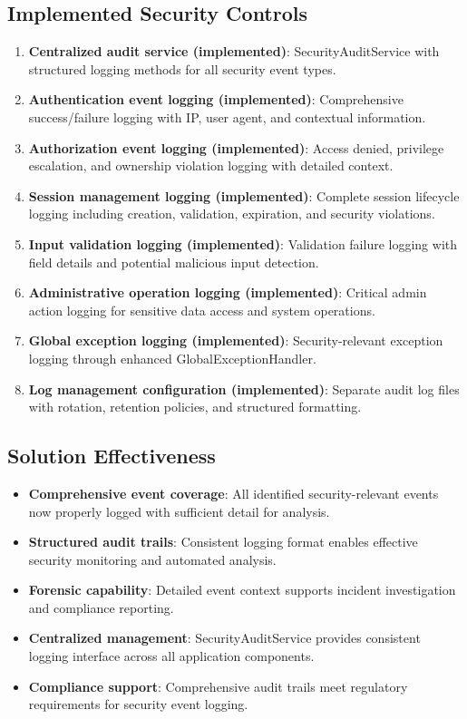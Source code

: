 \documentclass[]{UCD_CS_FYP_Report}
\begin{document}
\subsection{Implemented Security Controls}
\begin{enumerate}
	\item \textbf{Centralized audit service (implemented)}: SecurityAuditService with structured logging methods for all security event types.
	\item \textbf{Authentication event logging (implemented)}: Comprehensive success/failure logging with IP, user agent, and contextual information.
	\item \textbf{Authorization event logging (implemented)}: Access denied, privilege escalation, and ownership violation logging with detailed context.
	\item \textbf{Session management logging (implemented)}: Complete session lifecycle logging including creation, validation, expiration, and security violations.
	\item \textbf{Input validation logging (implemented)}: Validation failure logging with field details and potential malicious input detection.
	\item \textbf{Administrative operation logging (implemented)}: Critical admin action logging for sensitive data access and system operations.
	\item \textbf{Global exception logging (implemented)}: Security-relevant exception logging through enhanced GlobalExceptionHandler.
	\item \textbf{Log management configuration (implemented)}: Separate audit log files with rotation, retention policies, and structured formatting.
\end{enumerate}

\subsection{Solution Effectiveness}
\begin{itemize}
	\item \textbf{Comprehensive event coverage}: All identified security-relevant events now properly logged with sufficient detail for analysis.
	\item \textbf{Structured audit trails}: Consistent logging format enables effective security monitoring and automated analysis.
	\item \textbf{Forensic capability}: Detailed event context supports incident investigation and compliance reporting.
	\item \textbf{Centralized management}: SecurityAuditService provides consistent logging interface across all application components.
	\item \textbf{Compliance support}: Comprehensive audit trails meet regulatory requirements for security event logging.
\end{itemize}
\end{document}
